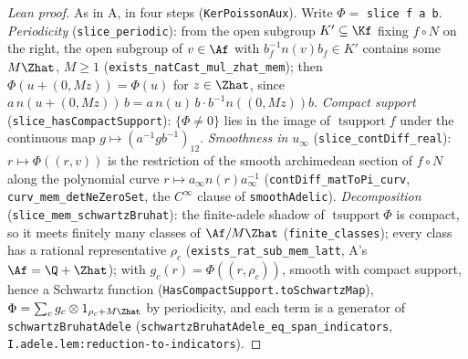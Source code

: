 \begin{proof}[Lean proof]
As in A, in four steps (\texttt{KerPoissonAux}). Write $\Phi=$ \texttt{slice f a b}. \emph{Periodicity} (\texttt{slice\_periodic}): from the open subgroup
$K'\subseteq\Kf$ fixing $f\circ N$ on the right, the open subgroup of $v\in\Af$ with $b_f^{-1}n(v)b_f\in K'$ contains some $M\Zhat$, $M\ge1$
(\texttt{exists\_natCast\_mul\_zhat\_mem}); then $\Phi(u+(0,Mz))=\Phi(u)$ for $z\in\Zhat$, since $a\,n(u+(0,Mz))\,b=a\,n(u)\,b\cdot b^{-1}n((0,Mz))b$.
\emph{Compact support} (\texttt{slice\_hasCompactSupport}): $\{\Phi\neq0\}$ lies in the image of $\operatorname{tsupport}f$ under the continuous map
$g\mapsto(a^{-1}gb^{-1})_{12}$. \emph{Smoothness in $u_\infty$} (\texttt{slice\_contDiff\_real}): $r\mapsto\Phi((r,v))$ is the restriction of the smooth
archimedean section of $f\circ N$ along the polynomial curve $r\mapsto a_\infty n(r)a_\infty^{-1}$ (\texttt{contDiff\_matToPi\_curv}, \texttt{curv\_mem\_detNeZeroSet},
the $C^\infty$ clause of \texttt{smoothAdelic}). \emph{Decomposition} (\texttt{slice\_mem\_schwartzBruhat}): the finite-adele shadow of $\operatorname{tsupport}\Phi$
is compact, so it meets finitely many classes of $\Af/M\Zhat$ (\texttt{finite\_classes}); every class has a rational representative $\rho_c$
(\texttt{exists\_rat\_sub\_mem\_latt}, A's $\Af=\Q+\Zhat$); with $g_c(r)=\Phi((r,\rho_c))$, smooth with compact support, hence a Schwartz function
(\texttt{HasCompactSupport.toSchwartzMap}), $\Phi=\sum_c g_c\otimes1_{\rho_c+M\Zhat}$ by periodicity, and each term is a generator of
\texttt{schwartzBruhatAdele} (\texttt{schwartzBruhatAdele\_eq\_span\_indicators}, \texttt{I.adele.lem:reduction-to-indicators}).
\end{proof}

